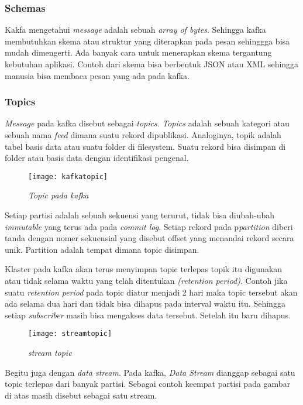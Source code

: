 \subsubsection{Schemas}
Kakfa mengetahui \textit{message} adalah sebuah \textit{array of bytes}. Sehingga kafka membutuhkan skema atau struktur yang diterapkan pada pesan sehinggga bisa mudah dimengerti. Ada banyak cara untuk menerapkan skema tergantung kebutuhan aplikasi. Contoh dari skema bisa berbentuk JSON atau XML
sehingga manusia bisa membaca pesan yang ada pada kafka.


\subsubsection{Topics}
\textit{Message} pada kafka disebut sebagai \textit{topics}. \textit{Topics} adalah sebuah kategori atau sebuah nama \textit{feed} dimana suatu rekord dipublikasi. Analoginya, topik adalah tabel basis data atau suatu folder di filesystem. Suatu rekord bisa disimpan di folder atau basis data dengan identifikasi pengenal.

\begin{figure}[H] 
	\centering  
	\texttt{[image: kafkatopic]}  
	\caption[Gambar Topic pada Kafka]{\textit{Topic pada kafka}} 
	\label{fig:kafka-topic} 
\end{figure}
Setiap partisi adalah sebuah sekuensi yang terurut, tidak bisa diubah-ubah \textit{immutable} yang terus ada pada \textit{commit log}. Setiap rekord pada p\textit{partition} diberi tanda dengan nomer sekuensial yang disebut offset yang menandai rekord secara unik. Partition adalah tempat dimana topic disimpan.

Klaster pada kafka akan terus menyimpan topic terlepas topik itu digunakan atau tidak selama waktu yang telah ditentukan \textit{(retention period)}. Contoh jika suatu \textit{retention period} pada topic diatur menjadi 2 hari maka topic tersebut akan ada selama dua hari dan tidak bisa dihapus pada interval waktu itu. Sehingga setiap \textit{subscriber} masih bisa mengakses data tersebut. Setelah itu baru dihapus.

\begin{figure}[H] 
	\centering  
	\texttt{[image: streamtopic]}  
	\caption[Gambar stream topic]{\textit{stream topic}} 
	\label{fig:kafka-stream} 
\end{figure}

Begitu juga dengan \textit{data stream}. Pada kafka, \textit{Data Stream} dianggap sebagai satu topic terlepas dari banyak partisi. Sebagai contoh keempat partisi pada gambar di atas masih disebut sebagai satu stream.

